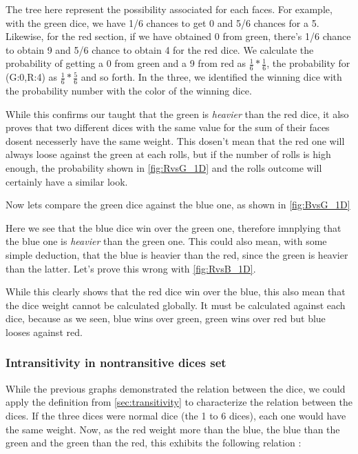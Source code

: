 \documentclass{article}
\begin{document}
    
    The tree here represent the possibility associated for each faces. For
    example, with the green dice, we have 1/6 chances to get 0 and 5/6 chances
    for a 5. Likewise, for the red section, if we have obtained 0 from green,
    there's 1/6 chance to obtain 9 and 5/6 chance to obtain 4 for the red dice.
    We calculate the probability of getting a 0 from green and a 9 from red
    as $\tfrac{1}{6}*\tfrac{1}{6}$, the probability for (G:0,R:4) as
    $\tfrac{1}{6}*\tfrac{5}{6}$ and so forth. In the three, we identified the
    winning dice with the probability number with the color of the winning dice.
    
    While this confirms our taught that the green is \textit{heavier} than the
    red dice, it also proves that two different dices with the same value for
    the sum of their faces dosent necesserly have the same weight. This dosen't
    mean that the red one will always loose against the green at each rolls, but
    if the number of rolls is high enough, the probability shown in
    \ref{fig:RvsG_1D} and the rolls outcome will certainly have a similar look.
    
    Now lets compare the green dice against the blue one, as
    shown in \ref{fig:BvsG_1D}
    
   
    Here we see that the blue dice win over the green one, therefore imnplying
    that the blue one is \textit{heavier} than the green one. This could also
    mean, with some simple deduction, that the blue is heavier than the red,
    since the green is heavier than the latter. Let's prove this wrong with
    \ref{fig:RvsB_1D}.
    
    
    While this clearly shows that the red dice win over the blue, this also mean
    that the dice weight cannot be calculated globally. It must be calculated
    against each dice, because as we seen, blue wins over green, green wins over
    red but blue looses against red. 
    
	\subsubsection{Intransitivity in nontransitive dices set}

    While the previous graphs demonstrated the relation between the dice, we
    could apply the definition from \ref{sec:transitivity} to characterize the
    relation between the dices. If the three dices were normal dice (the 1 to 6
    dices), each one would have the same weight. Now, as the red weight more
    than the blue, the blue than the green and the green than the red, this
    exhibits the following relation :
    
\end{document}
